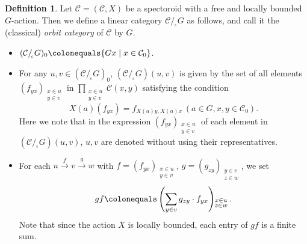 \documentclass{surv-l}
\makeatletter
\DeclareRobustCommand{\forcelinebreak}{%
    \@ifstar{\unskip\\\ignorespaces}{\unskip\linebreak}%
}
\numberwithin{equation}{chapter}
\numberwithin{figure}{chapter}
\theoremstyle{plain}
\theoremstyle{definition}
\newtheorem{dfn}[thm]{Definition}
\theoremstyle{remark}
\newcommand{\corbit}{/\!_{_{\mathrm{c}}}}
\makeatother
\begin{document}
\begin{dfn}
Let ${\mathcal{C}} = ({\mathcal{C}}, X)$ be a spectoroid with a free and locally bounded $G$-action.
Then we define a linear category ${\mathcal{C}}\corbit G$ as follows, and call it
the (classical) \emph{orbit category} of ${\mathcal{C}}$ by $G$.
\begin{itemize}
\item
$({\mathcal{C}}\corbit G)_0\colonequals  \{Gx \mid x \in {\mathcal{C}}_0\}$.
\item
For any $u, v \in ({\mathcal{C}}\corbit G)_0$,
$({\mathcal{C}}\corbit G)(u,v)$ is given by the set of all elements
$(f_{yx})_{\begin{smallmatrix} x\in u \\ y\in v \end{smallmatrix}}$ in
$\prod_{\begin{smallmatrix} x\in u \\ y\in v \end{smallmatrix}}{\mathcal{C}}(x,y)$ satisfying the condition
\[
 X(a)(f_{yx}) = f_{X(a)y, X(a)x}\ (a \in G, x, y \in {\mathcal{C}}_0).
\]
Here we note that in the expression $(f_{yx})_{\begin{smallmatrix} x\in u \\ y\in v \end{smallmatrix}}$ of each element
in\forcelinebreak $({\mathcal{C}}\corbit G)(u,v)$, $u,v$ are denoted without using their representatives.
\item
For each $u \xrightarrow{f} v \xrightarrow{g} w$ with $f = (f_{yx})_{\begin{smallmatrix} x\in u \\ y\in v \end{smallmatrix}}$,
$g = (g_{zy})_{\begin{smallmatrix} y\in v \\ z\in w \end{smallmatrix}}$, we set
\[
gf\colonequals  \left(\sum_{y\in v} g_{zy}\cdot f_{yx}\right)\!\!_{\begin{smallmatrix} x\in u \\ z\in w \end{smallmatrix}}.
\]
Note that since the action $X$ is locally bounded,
each entry of $gf$ is a finite sum.
\end{itemize}
\end{dfn}
\end{document}
